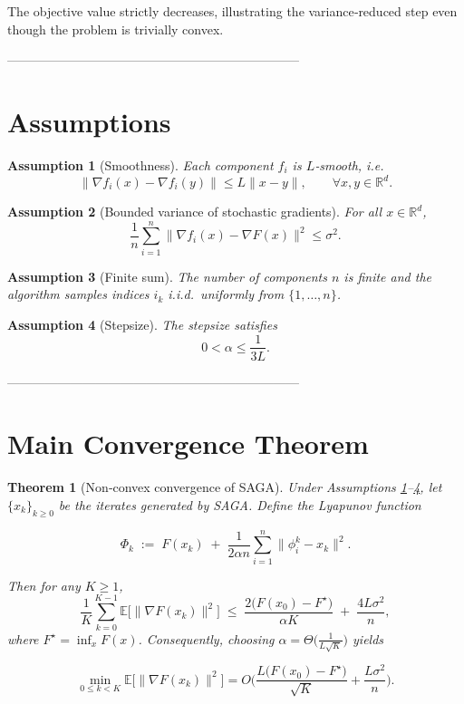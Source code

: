 \documentclass{article}
\newtheorem{theorem}{Theorem}
\newtheorem{assumption}{Assumption}
\newcommand{\E}{\mathbb{E}}
\newcommand{\R}{\mathbb{R}}
\begin{document}
The objective value strictly decreases, illustrating the variance‑reduced step even though the problem is trivially convex.

---------------------------------------------------------------------

\section*{Assumptions}

\begin{assumption}[Smoothness]\label{ass:smooth}
Each component $f_i$ is $L$‑smooth, i.e.
\[
\|\nabla f_i(x)-\nabla f_i(y)\|\le L\|x-y\|,\qquad \forall x,y\in\R^{d}.
\]
\end{assumption}

\begin{assumption}[Bounded variance of stochastic gradients]\label{ass:bounded}
For all $x\in\R^{d}$,
\[
\frac1n\sum_{i=1}^{n}\|\nabla f_i(x)-\nabla F(x)\|^{2}\le \sigma^{2}.
\]
\end{assumption}

\begin{assumption}[Finite sum]\label{ass:finite}
The number of components $n$ is finite and the algorithm samples indices $i_k$ i.i.d.\ uniformly from $\{1,\dots,n\}$.
\end{assumption}

\begin{assumption}[Stepsize]\label{ass:step}
The stepsize satisfies 
\[
0<\alpha\le \frac{1}{3L}.
\]
\end{assumption}

---------------------------------------------------------------------

\section*{Main Convergence Theorem}

\begin{theorem}[Non‑convex convergence of SAGA]\label{thm:main}
Under Assumptions \ref{ass:smooth}–\ref{ass:step}, let $\{x_k\}_{k\ge0}$ be the iterates generated by SAGA. Define the Lyapunov function  

\[
\Phi_k \;:=\; F(x_k) \;+\; \frac{1}{2\alpha n}\sum_{i=1}^{n}\|\phi_i^{k}-x_k\|^{2}.
\tag{4}
\]

Then for any $K\ge1$,
\[
\frac{1}{K}\sum_{k=0}^{K-1}\E\big[\|\nabla F(x_k)\|^{2}\big]
\;\le\;
\frac{2\big(F(x_0)-F^{\star}\big)}{\alpha K}
\;+\;
\frac{4L\sigma^{2}}{n},
\tag{5}
\]
where $F^{\star}=\inf_{x}F(x)$.
Consequently, choosing $\alpha =\Theta\!\big(\frac{1}{L\sqrt{K}}\big)$ yields  

\[
\min_{0\le k<K}\E\big[\|\nabla F(x_k)\|^{2}\big]=O\!\Big(\frac{L\big(F(x_0)-F^{\star}\big)}{\sqrt{K}}+\frac{L\sigma^{2}}{n}\Big).
\]
\end{theorem}
\end{document}
